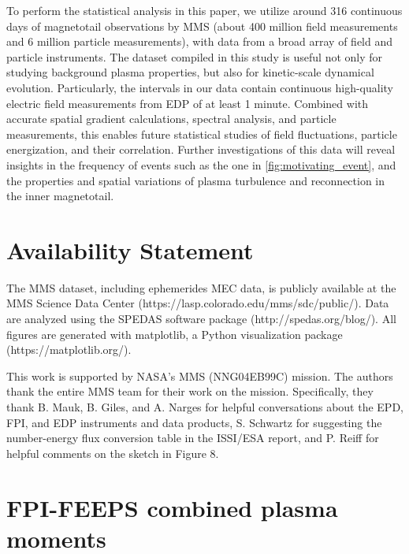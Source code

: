 \documentclass[draft]{agujournal2019}
\begin{document}
To perform the statistical analysis in this paper, we utilize around 316 continuous days of magnetotail observations by MMS (about 400 million field measurements and 6 million particle measurements), with data from a broad array of field and particle instruments. The dataset compiled in this study is useful not only for studying background plasma properties, but also for kinetic-scale dynamical evolution. Particularly, the intervals in our data contain continuous high-quality electric field measurements from EDP of at least 1 minute. Combined with accurate spatial gradient calculations, spectral analysis, and particle measurements, this enables future statistical studies of field fluctuations, particle energization, and their correlation. Further investigations of this data will reveal insights in the frequency of events such as the one in \cref{fig:motivating_event}, and the properties and spatial variations of plasma turbulence and reconnection in the inner magnetotail. 

\section*{Availability Statement}

The MMS dataset, including ephemerides MEC data, is publicly available at the MMS Science Data Center (https://lasp.colorado.edu/mms/sdc/public/). Data are analyzed using the SPEDAS software package (http://spedas.org/blog/). All figures are generated with matplotlib, a Python visualization package (https://matplotlib.org/).

\acknowledgments

This work is supported by NASA’s MMS (NNG04EB99C) mission. The authors thank the entire MMS team for their work on the mission. Specifically, they thank B. Mauk, B. Giles, and A. Narges for helpful conversations about the EPD, FPI, and EDP instruments and data products, S. Schwartz for suggesting the number-energy flux conversion table in the ISSI/ESA report, and P. Reiff for helpful comments on the sketch in Figure 8.

\appendix
\section{FPI-FEEPS combined plasma moments}\label{appendix:combined_plasma_moments}
\end{document}
